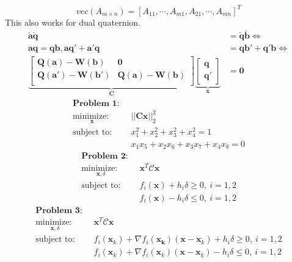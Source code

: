 $$
vec(A_{m\times n})=[A_{11}, \cdots, A_{m1}, A_{21}, \cdots, A_{mn}]^T
$$
This also works for dual quaternion.
\begin{align}
\check{\mathbf{a}}\check{\mathbf{q}}&=\check{\mathbf{q}}
\check{\mathbf{b}} \Leftrightarrow \\
\mathbf{a}\mathbf{q}=\mathbf{q}\mathbf{b}, \mathbf{a}\mathbf{q}'+\mathbf{a}'\mathbf{q}&=\mathbf{q}\mathbf{b}'+\mathbf{q}'\mathbf{b}  \Leftrightarrow \\
\underbrace{
\left[
\begin{matrix}
\mathbf{Q}(\mathbf{a})-\mathbf{W}(\mathbf{b}) & \mathbf{0} \\
\mathbf{Q}(\mathbf{a}')-\mathbf{W}(\mathbf{b}') & \mathbf{Q}(\mathbf{a})-\mathbf{W}(\mathbf{b}) \\
\end{matrix}
\right]}_{\mathbf{C}}
\underbrace{
\left[
\begin{matrix}
\mathbf{q} \\
\mathbf{q}'
\end{matrix}
\right]}_{\mathbf{x}}&=\mathbf{0}
\end{align}
\begin{align}
\textbf{Problem 1: } \nonumber \\
\underset{\mathbf{x}}{\text{minimize: }}& \ ||\mathbf{Cx}||_2^2 \\
{\text{subject to: }}& \ x_1^2+x_2^2+x_3^2+x_4^2=1 \\
& \ x_1x_5+x_2x_6+x_3x_7+x_4x_8=0
\end{align}
\begin{align}
\textbf{Problem 2: } \nonumber \\
\underset{\mathbf{x}, \delta}{\text{minimize: }}& \ \mathbf{x}^T\mathcal{C}\mathbf{x} \\
{\text{subject to: }}& \ f_i(\mathbf{x}) + h_i\delta \geq 0,\ i=1,2 \\
& \ f_i(\mathbf{x}) - h_i\delta \leq 0,\ i=1,2 
\end{align}
\begin{align}
\textbf{Problem 3: } \nonumber \\
\underset{\mathbf{x}, \delta}{\text{minimize: }}& \ \mathbf{x}^T\mathcal{C}\mathbf{x} \\
{\text{subject to: }}& \ f_i(\mathbf{x}_k) + \nabla f_i(\mathbf{x_k})(\mathbf{x}-\mathbf{x}_k) + h_i\delta \geq 0,\ i=1,2 \\
& \ f_i(\mathbf{x}_k) + \nabla f_i(\mathbf{x}_k)(\mathbf{x}-\mathbf{x}_k) - h_i\delta \leq 0,\ i=1,2 
\end{align}

